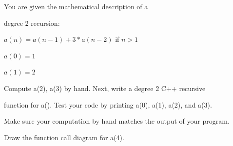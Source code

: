 You are given the mathematical description of a

degree 2 recursion:



$a(n) = a(n-1) + 3 * a(n-2)$ if $n > 1$



$a(0) = 1$



$a(1) = 2$



Compute a(2), a(3) by hand. Next, write a degree 2 C++ recursive

function for a(). Test your code by printing a(0), a(1), a(2), and a(3).

Make sure your computation by hand matches the output of your program.

Draw the function call diagram for a(4).


